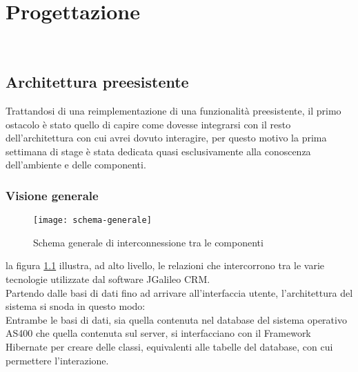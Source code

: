 
\chapter{Progettazione}
\label{cap:progettazione}

\\ %

\section{Architettura preesistente}
Trattandosi di una reimplementazione di una funzionalità preesistente, il primo ostacolo è stato quello di capire come dovesse integrarsi con il resto dell'architettura con cui avrei dovuto interagire, per questo motivo la prima settimana di stage è stata dedicata quasi esclusivamente alla conoscenza dell'ambiente e delle componenti. \\
\subsection{Visione generale}

\begin{figure}[h]
	\centering
	\texttt{[image: schema-generale]}
	\caption{Schema generale di interconnessione tra le componenti}
	\label{schema-generale}
\end{figure}
la figura \ref{schema-generale} illustra, ad alto livello, le relazioni che intercorrono tra le varie tecnologie utilizzate dal software JGalileo CRM.\\
Partendo dalle basi di dati fino ad arrivare all'interfaccia utente, l'architettura del sistema si snoda in questo modo:\\
Entrambe le basi di dati, sia quella contenuta nel database del sistema operativo AS400 che quella contenuta sul server, si interfacciano con il Framework Hibernate per creare delle classi, equivalenti alle tabelle del database, con cui permettere l'interazione.
